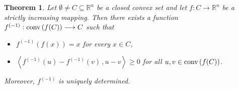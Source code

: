 \documentclass[12pt]{amsart}
\newtheorem{thm}{Theorem}%
\theoremstyle{remark}
\theoremstyle{definition}
\newcommand{\RR}{\mathbb{R}}
\newcommand{\Rn}{\mathbb{R}^n}
\newcommand{\conv}{\mbox{\rm conv}}
\newcommand{\map}{\longrightarrow}
\newcommand{\bsz}[2]{\left \langle #1 \,, #2 \right \rangle}
\begin{document}
\begin{thm}\label{thm-MainThm-closed}
Let $ \emptyset \neq C \subseteq \Rn $ be a 
closed convex set and let 
$ f : C \map \Rn $ be a strictly increasing mapping. 
Then there exists a function 
$ f^{(-1)} : \conv \left( f(C) \right) \map C $ 
such that 
\begin{itemize}
\item $ f^{(-1)} \left( f(x) \right) = x $ 
for every $ x \in C $, 
\item $ \bsz{ f^{(-1)}(u)- 
f^{(-1)}(v) }{ u-v } \geq 0 $  
for all $ u,v \in \conv \left( f(C) \right) $. 
\end{itemize}
Moreover, $ f^{(-1)} $ is uniquely determined. 
\end{thm}
\end{document}
